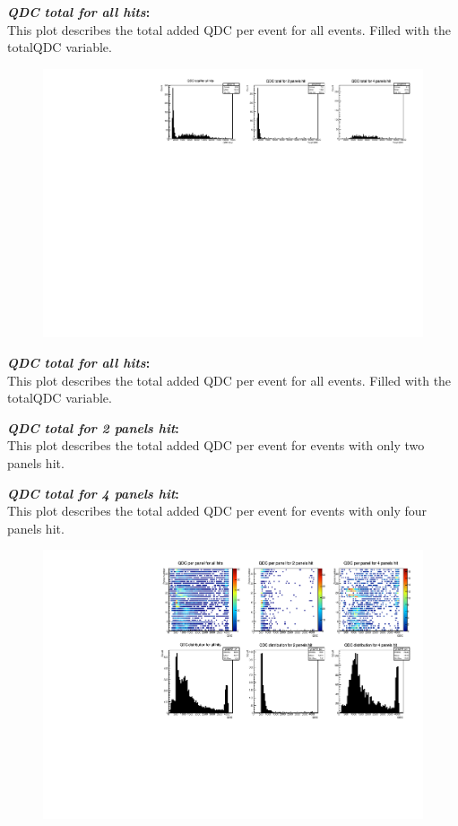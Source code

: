 \documentclass[a4paper,12pt]{article}
\begin{document}
\textbf{\emph{QDC total for all hits}:} \\
This plot describes the total added QDC per event for all events. Filled with the totalQDC variable.

\pagebreak
\begin{figure}[h]
\centering
\includegraphics[scale=0.8]{QDCtotal.pdf}
\end{figure}

\textbf{\emph{QDC total for all hits}:} \\
This plot describes the total added QDC per event for all events. Filled with the totalQDC variable.

\textbf{\emph{QDC total for 2 panels hit}:} \\
This plot describes the total added QDC per event for events with only two panels hit.

\textbf{\emph{QDC total for 4 panels hit}:} \\
This plot describes the total added QDC per event for events with only four panels hit.

\pagebreak
\begin{figure}[h]
\centering
\includegraphics[scale=0.8]{qdcDisplay.pdf}
\end{figure}
\end{document}

